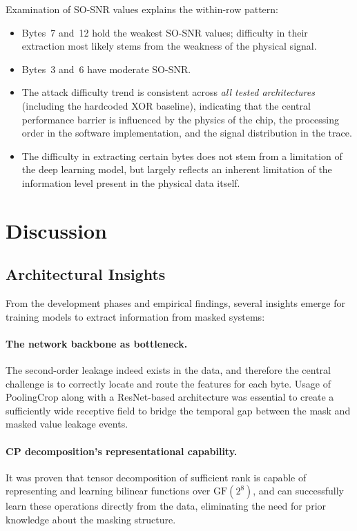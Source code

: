 \documentclass[runningheads]{llncs}
\newcommand{\GF}{\mathrm{GF}}
\begin{document}
Examination of SO-SNR values explains the within-row pattern:
\begin{itemize}[leftmargin=*]
  \item Bytes~7 and~12 hold the weakest SO-SNR values; difficulty in their extraction most likely stems from the weakness of the physical signal.
  \item Bytes~3 and~6 have moderate SO-SNR.
  \item The attack difficulty trend is consistent across \emph{all tested architectures} (including the hardcoded XOR baseline), indicating that the central performance barrier is influenced by the physics of the chip, the processing order in the software implementation, and the signal distribution in the trace.
  \item The difficulty in extracting certain bytes does not stem from a limitation of the deep learning model, but largely reflects an inherent limitation of the information level present in the physical data itself.
\end{itemize}


\section{Discussion}\label{sec:discussion}

\subsection{Architectural Insights}

From the development phases and empirical findings, several insights emerge for training models to extract information from masked systems:

\paragraph{The network backbone as bottleneck.}
The second-order leakage indeed exists in the data, and therefore the central challenge is to correctly locate and route the features for each byte.
Usage of PoolingCrop along with a ResNet-based architecture was essential to create a sufficiently wide receptive field to bridge the temporal gap between the mask and masked value leakage events.

\paragraph{CP decomposition's representational capability.}
It was proven that tensor decomposition of sufficient rank is capable of representing and learning bilinear functions over $\GF(2^8)$, and can successfully learn these operations directly from the data, eliminating the need for prior knowledge about the masking structure.
\end{document}
